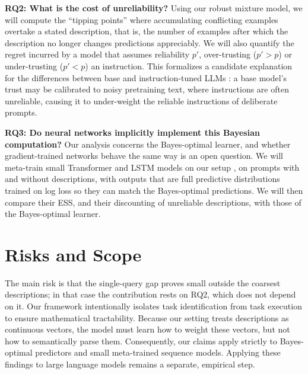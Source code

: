 \documentclass[10pt,letterpaper]{article}
\begin{document}
\textbf{RQ2: What is the cost of unreliability?} Using our robust mixture model, we will compute the ``tipping points'' where accumulating conflicting examples overtake a stated description, that is, the number of examples after which the description no longer changes predictions appreciably. We will also quantify the regret incurred by a model that assumes reliability $p'$, over-trusting ($p' > p$) or under-trusting ($p' < p$) an instruction. This formalizes a candidate explanation for the differences between base and instruction-tuned LLMs \citep{gupta2025}: a base model's trust may be calibrated to noisy pretraining text, where instructions are often unreliable, causing it to under-weight the reliable instructions of deliberate prompts.

\textbf{RQ3: Do neural networks implicitly implement this Bayesian computation?} Our analysis concerns the Bayes-optimal learner, and whether gradient-trained networks behave the same way is an open question. We will meta-train small Transformer and LSTM models on our setup \citep{mikulik2020,genewein2025}, on prompts with and without descriptions, with outputs that are full predictive distributions trained on log loss so they can match the Bayes-optimal predictions. We will then compare their ESS, and their discounting of unreliable descriptions, with those of the Bayes-optimal learner.

\section{Risks and Scope}
The main risk is that the single-query gap proves small outside the coarsest descriptions; in that case the contribution rests on RQ2, which does not depend on it. Our framework intentionally isolates task identification from task execution to ensure mathematical tractability. Because our setting treats descriptions as continuous vectors, the model must learn how to weight these vectors, but not how to semantically parse them. Consequently, our claims apply strictly to Bayes-optimal predictors and small meta-trained sequence models. Applying these findings to large language models remains a separate, empirical step.
\end{document}

